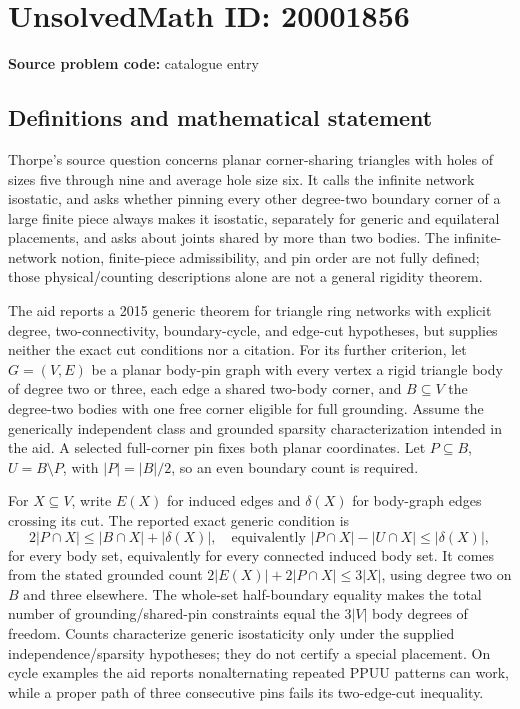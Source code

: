 \documentclass[11pt]{article}
\begin{document}
\section*{UnsolvedMath ID: 20001856}
\textbf{Source problem code:} catalogue entry
\subsection{Definitions and mathematical statement}
Thorpe's source question concerns planar corner-sharing triangles with holes of sizes five through nine and average hole size six. It calls the infinite network isostatic, and asks whether pinning every other degree-two boundary corner of a large finite piece always makes it isostatic, separately for generic and equilateral placements, and asks about joints shared by more than two bodies. The infinite-network notion, finite-piece admissibility, and pin order are not fully defined; those physical/counting descriptions alone are not a general rigidity theorem.

The aid reports a 2015 generic theorem for triangle ring networks with explicit degree, two-connectivity, boundary-cycle, and edge-cut hypotheses, but supplies neither the exact cut conditions nor a citation. For its further criterion, let \(G=(V,E)\) be a planar body-pin graph with every vertex a rigid triangle body of degree two or three, each edge a shared two-body corner, and \(B\subseteq V\) the degree-two bodies with one free corner eligible for full grounding. Assume the generically independent class and grounded sparsity characterization intended in the aid. A selected full-corner pin fixes both planar coordinates. Let \(P\subseteq B\), \(U=B\setminus P\), with \(|P|=|B|/2\), so an even boundary count is required.

For \(X\subseteq V\), write \(E(X)\) for induced edges and \(\delta(X)\) for body-graph edges crossing its cut. The reported exact generic condition is
\[
 2|P\cap X|\le|B\cap X|+|\delta(X)|,
 \quad\text{equivalently }|P\cap X|-|U\cap X|\le|\delta(X)|,
\]
for every body set, equivalently for every connected induced body set. It comes from the stated grounded count \(2|E(X)|+2|P\cap X|\le3|X|\), using degree two on \(B\) and three elsewhere. The whole-set half-boundary equality makes the total number of grounding/shared-pin constraints equal the \(3|V|\) body degrees of freedom. Counts characterize generic isostaticity only under the supplied independence/sparsity hypotheses; they do not certify a special placement. On cycle examples the aid reports nonalternating repeated PPUU patterns can work, while a proper path of three consecutive pins fails its two-edge-cut inequality.
\end{document}
